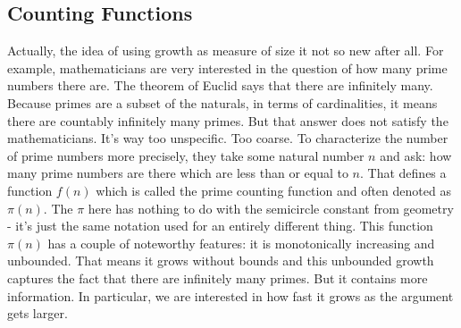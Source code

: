 \documentclass[12pt]{article}
\begin{document}

%




\subsection{Counting Functions}
Actually, the idea of using growth as measure of size it not so new after all. For example, mathematicians are very interested in the question of how many prime numbers there are. The theorem of Euclid says that there are infinitely many. Because primes are a subset of the naturals, in terms of cardinalities, it means there are countably infinitely many primes. But that answer does not satisfy the mathematicians. It's way too unspecific. Too coarse. To characterize the number of prime numbers more precisely, they take some natural number $n$ and ask: how many prime numbers are there which are less than or equal to $n$. That defines a function $f(n)$ which is called the prime counting function and often denoted as $\pi(n)$. The $\pi$ here has nothing to do with the semicircle constant from geometry - it's just the same notation used for an entirely different thing. This function $\pi(n)$ has a couple of noteworthy features: it is monotonically increasing and unbounded. That means it grows without bounds and this unbounded growth captures the fact that there are infinitely many primes. But it contains more information. In particular, we are interested in how fast it grows as the argument gets larger. 
\end{document}
